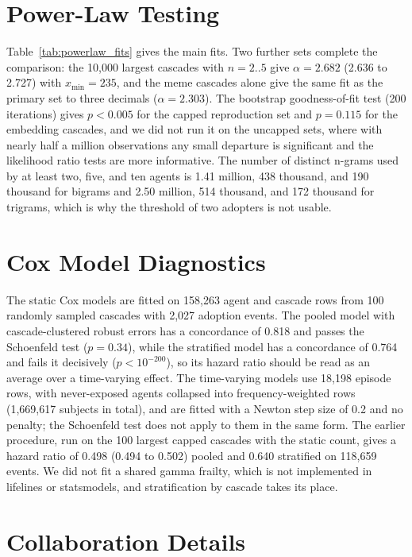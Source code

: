 \documentclass{article}
\begin{document}
\section{Power-Law Testing}
\label{app:powerlaw}

Table~\ref{tab:powerlaw_fits} gives the main fits. Two further sets complete the comparison: the 10,000 largest cascades with $n = 2..5$ give $\alpha = 2.682$ (2.636 to 2.727) with $x_{\min} = 235$, and the meme cascades alone give the same fit as the primary set to three decimals ($\alpha = 2.303$). The bootstrap goodness-of-fit test (200 iterations) gives $p < 0.005$ for the capped reproduction set and $p = 0.115$ for the embedding cascades, and we did not run it on the uncapped sets, where with nearly half a million observations any small departure is significant and the likelihood ratio tests are more informative. The number of distinct n-grams used by at least two, five, and ten agents is 1.41 million, 438 thousand, and 190 thousand for bigrams and 2.50 million, 514 thousand, and 172 thousand for trigrams, which is why the threshold of two adopters is not usable.

\section{Cox Model Diagnostics}
\label{app:cox}

The static Cox models are fitted on 158,263 agent and cascade rows from 100 randomly sampled cascades with 2,027 adoption events. The pooled model with cascade-clustered robust errors has a concordance of 0.818 and passes the Schoenfeld test ($p = 0.34$), while the stratified model has a concordance of 0.764 and fails it decisively ($p < 10^{-200}$), so its hazard ratio should be read as an average over a time-varying effect. The time-varying models use 18,198 episode rows, with never-exposed agents collapsed into frequency-weighted rows (1,669,617 subjects in total), and are fitted with a Newton step size of 0.2 and no penalty; the Schoenfeld test does not apply to them in the same form. The earlier procedure, run on the 100 largest capped cascades with the static count, gives a hazard ratio of 0.498 (0.494 to 0.502) pooled and 0.640 stratified on 118,659 events. We did not fit a shared gamma frailty, which is not implemented in lifelines or statsmodels, and stratification by cascade takes its place.

\section{Collaboration Details}
\label{app:task3}
\end{document}
